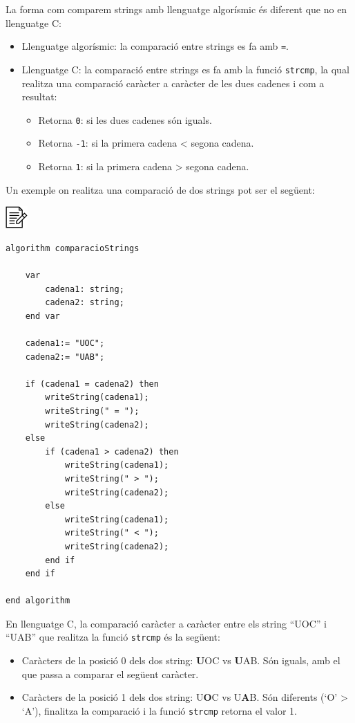 \documentclass[]{book}
\providecommand{\tightlist}{%
  \setlength{\itemsep}{0pt}\setlength{\parskip}{0pt}}
\begin{document}
La forma com comparem strings amb llenguatge algorísmic és diferent que no en llenguatge C:

\begin{itemize}
\tightlist
\item
  Llenguatge algorísmic: la comparació entre strings es fa amb \texttt{=}.
\item
  Llenguatge C: la comparació entre strings es fa amb la funció \texttt{strcmp}, la qual realitza una comparació caràcter a caràcter de les dues cadenes i com a resultat:

  \begin{itemize}
  \tightlist
  \item
    Retorna \texttt{0}: si les dues cadenes són iguals.
  \item
    Retorna \texttt{-1}: si la primera cadena \textless{} segona cadena.
  \item
    Retorna \texttt{1}: si la primera cadena \textgreater{} segona cadena.
  \end{itemize}
\end{itemize}

Un exemple on realitza una comparació de dos strings pot ser el següent:

\includegraphics{./img/alg.png}

\begin{verbatim}
algorithm comparacioStrings

    var
        cadena1: string;
        cadena2: string;
    end var

    cadena1:= "UOC";
    cadena2:= "UAB";

    if (cadena1 = cadena2) then
        writeString(cadena1);
        writeString(" = ");
        writeString(cadena2);
    else
        if (cadena1 > cadena2) then
            writeString(cadena1);
            writeString(" > ");
            writeString(cadena2);
        else
            writeString(cadena1);
            writeString(" < ");
            writeString(cadena2);
        end if
    end if

end algorithm
\end{verbatim}

En llenguatge C, la comparació caràcter a caràcter entre els string ``UOC'' i ``UAB'' que realitza la funció \texttt{strcmp} és la següent:

\begin{itemize}
\tightlist
\item
  Caràcters de la posició 0 dels dos string: \textbf{U}OC vs \textbf{U}AB. Són iguals, amb el que passa a comparar el següent caràcter.
\item
  Caràcters de la posició 1 dels dos string: U\textbf{O}C vs U\textbf{A}B. Són diferents (`O' \textgreater{} `A'), finalitza la comparació i la funció \texttt{strcmp} retorna el valor 1.
\end{itemize}
\end{document}
